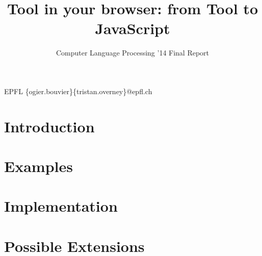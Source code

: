 \documentclass[nocopyrightspace,11pt,authoryear,preprint]{sigplanconf}
\begin{document}


\title{Tool in your browser: from Tool to JavaScript}
\subtitle{Computer Language Processing '14 Final Report}

           {EPFL}
           {\{ogier.bouvier\}\{tristan.overney\}@epfl.ch}

\maketitle

\section{Introduction}


\section{Examples}


\section{Implementation}


\section{Possible Extensions}




\end{document}
